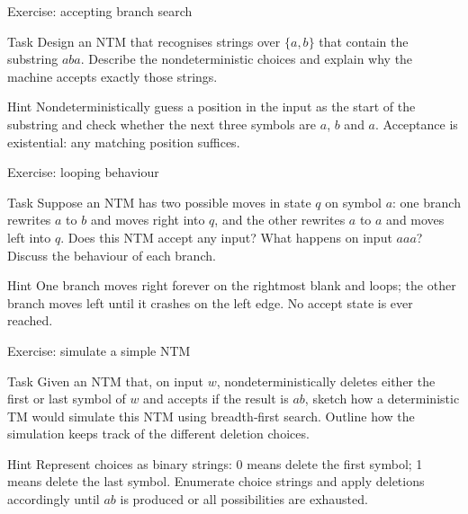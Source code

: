 \begin{frame}[t]{Exercise: accepting branch search}
  \begin{tblock}{Task}
    Design an NTM that recognises strings over $\{a,b\}$ that contain
    the substring $aba$.  Describe the nondeterministic choices and
    explain why the machine accepts exactly those strings.
  \end{tblock}
  \begin{talert}{Hint}
    Nondeterministically guess a position in the input as the start of
    the substring and check whether the next three symbols are $a$,
    $b$ and $a$.  Acceptance is existential: any matching position
    suffices.
  \end{talert}
  \label{fr:7.7-11}
\end{frame}

\begin{frame}[t]{Exercise: looping behaviour}
  \begin{tblock}{Task}
    Suppose an NTM has two possible moves in state $q$ on symbol $a$:
    one branch rewrites $a$ to $b$ and moves right into $q$, and the
    other rewrites $a$ to $a$ and moves left into $q$.  Does this NTM
    accept any input?  What happens on input $aaa$?  Discuss the
    behaviour of each branch.
  \end{tblock}
  \begin{talert}{Hint}
    One branch moves right forever on the rightmost blank and loops;
    the other branch moves left until it crashes on the left edge.  No
    accept state is ever reached.
  \end{talert}
  \label{fr:7.7-12}
\end{frame}

\begin{frame}[t]{Exercise: simulate a simple NTM}
  \begin{tblock}{Task}
    Given an NTM that, on input $w$, nondeterministically deletes
    either the first or last symbol of $w$ and accepts if the result
    is $ab$, sketch how a deterministic TM would simulate this NTM
    using breadth‑first search.  Outline how the simulation keeps
    track of the different deletion choices.
  \end{tblock}
  \begin{talert}{Hint}
    Represent choices as binary strings: 0 means delete the first
    symbol; 1 means delete the last symbol.  Enumerate choice strings
    and apply deletions accordingly until $ab$ is produced or all
    possibilities are exhausted.
  \end{talert}
  \label{fr:7.7-13}
\end{frame}


